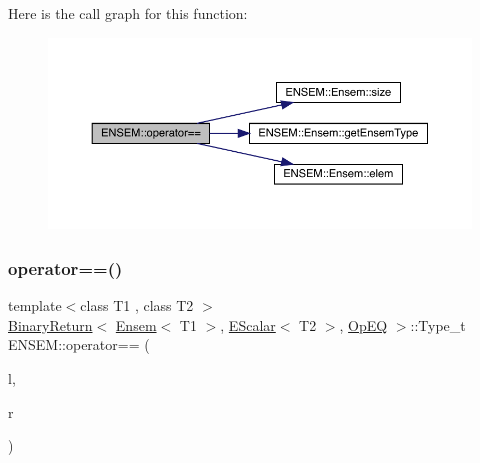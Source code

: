 Here is the call graph for this function\+:\nopagebreak
\begin{figure}[H]
\begin{center}
\leavevmode
\includegraphics[width=350pt]{d1/d9e/group__eensem_ga8f2413d9b23131f67cbe4d3bd222e0ec_cgraph}
\end{center}
\end{figure}
\mbox{\label{group__eensem_ga4b52007b3c1511c746a46b46e5b145b1}} 
\subsubsection{\texorpdfstring{operator==()}{operator==()}\hspace{0.1cm}{\footnotesize\ttfamily [2/3]}}
{\footnotesize\ttfamily template$<$class T1 , class T2 $>$ \\
\mbox{\hyperlink{structENSEM_1_1BinaryReturn}{Binary\+Return}}$<$ \mbox{\hyperlink{classENSEM_1_1Ensem}{Ensem}}$<$ T1 $>$, \mbox{\hyperlink{classENSEM_1_1EScalar}{E\+Scalar}}$<$ T2 $>$, \mbox{\hyperlink{structENSEM_1_1OpEQ}{Op\+EQ}} $>$\+::Type\+\_\+t E\+N\+S\+E\+M\+::operator== (\begin{DoxyParamCaption}\item[{const \mbox{\hyperlink{classENSEM_1_1Ensem}{Ensem}}$<$ T1 $>$ \&}]{l,  }\item[{const \mbox{\hyperlink{classENSEM_1_1EScalar}{E\+Scalar}}$<$ T2 $>$ \&}]{r }\end{DoxyParamCaption})\hspace{0.3cm}{\ttfamily [inline]}}

